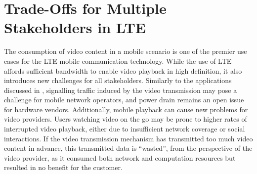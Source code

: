 \section{Trade-Offs for Multiple Stakeholders in LTE}\label{sec:application:lte_video}

\newcommand{\bandwidth}{\ensuremath{b_W}\xspace}
\newcommand{\bitrate}{\ensuremath{b_R}\xspace}
\newcommand{\timeplayedback}{\ensuremath{t_p}}

\newcommand{\streamingstart}{\ensuremath{\sigma}\xspace}
\newcommand{\bufferlower}{\ensuremath{\theta}\xspace}
\newcommand{\buffersize}{\ensuremath{\Theta}\xspace}

\newcommand{\ton}{\(T_{\texttt{ON}}\)\xspace}
\newcommand{\tdrxinactivity}{\(T_{\texttt{I}}\)\xspace}

\newcommand{\shortdrx}{\texttt{Short DRX}\xspace}
\newcommand{\tshortdrx}{\(T_{\texttt{S}}\)\xspace}
\newcommand{\longdrx}{\texttt{Long DRX}\xspace}
\newcommand{\tlongdrx}{\(T_{\texttt{L}}\)\xspace}
\newcommand{\rrcconnected}{\texttt{RRC Connected}\xspace}
\newcommand{\tidle}{\(T_{\texttt{Idle}}\)\xspace}
\newcommand{\tonidle}{\(T^{\texttt{Idle}}_{\texttt{ON}}\)\xspace}
\newcommand{\rrcidle}{\texttt{RRC Idle}\xspace}
\newcommand{\tdrxidle}{\(T^{\texttt{Idle}}_{\texttt{\gls{DRX}}}\)\xspace}
\newcommand{\promotiondelay}{\(D_P\)\xspace}

\newcommand{\bandwidthdown}{b_d\xspace}
\newcommand{\timedownloaded}{\ensuremath{t_d}}

\newcommand{\power}{P\xspace}
\newcommand{\energyconsumption}{\ensuremath{E}\xspace}
\newcommand{\connectioncount}{\ensuremath{C}\xspace}

\newcommand{\factordown}{\ensuremath{\alpha}\xspace}
\newcommand{\powerbaseline}{\ensuremath{\beta}\xspace}

\newcommand{\userabortrv}{\ensuremath{A}\xspace}
\newcommand{\userabortpdf}{\ensuremath{a}\xspace}
\newcommand{\meanwastedtraffic}{\ensuremath{W}\xspace}

\newcommand{\timeunwatched}{\ensuremath{t_u}}
\newcommand{\videolength}{l\xspace}

The consumption of video content in a mobile scenario is one of the premier use cases for the \gls{LTE} mobile communication technology.
While the use of \gls{LTE} affords sufficient bandwidth to enable video playback in high definition, it also introduces new challenges for all stakeholders.
Similarly to the applications discussed in , signalling traffic induced by the video transmission may pose a challenge for mobile network operators, and power drain remains an open issue for hardware vendors.
Additionally, mobile playback can cause new problems for video providers.
Users watching video on the go may be prone to higher rates of interrupted video playback, either due to insufficient network coverage or social interactions.
If the video transmission mechanism has transmitted too much video content in advance, this transmitted data is ``wasted'', from the perspective of the video provider, as it consumed both network and computation resources but resulted in no benefit for the customer.

